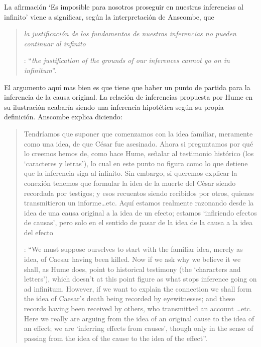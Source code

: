 La afirmación \enquote*{Es imposible para nosotros proseguir en nuestras inferencias al infinito} viene a significar, según la interpretación de Anscombe, que \blockquote[{\Cite[Cf.][87]{anscombe1981parmenides:humeandjulius}}: \enquote{\emph{the justification of the grounds of our inferences cannot go on in infinitum}}.]{\emph{la justificación de los fundamentos de nuestras inferencias no pueden continuar al infinito}}. El argumento aquí mas bien es que tiene que haber un punto de partida para la inferencia de la causa original. La relación de inferencias propuesta por Hume en su ilustración acabaría siendo una inferencia hipotética según su propia definición. Anscombe explica diciendo: \blockquote[{\Cite[117]{anscombe2011plato:humecaus}}: \enquote{We must suppose ourselves to start with the familiar idea, merely as idea, of Caesar having been killed. Now if we ask why we believe it we shall, as Hume does, point to historical testimony (the ‘characters and letters’), which doesn’t at this point figure as what stops inference going on ad infinitum. However, if we want to explain the connection we shall form the idea of Caesar’s death being recorded by eyewitnesses; and these records having been received by others, who transmitted an account \ldots etc. Here we really are arguing from the idea of an original cause to the idea of an effect; we are ‘inferring effects from causes’, though only in the sense of passing from the idea of the cause to the idea of the effect}.]{Tendríamos que suponer que comenzamos con la idea familiar, meramente como una idea, de que César fue asesinado. Ahora si preguntamos por qué lo creemos hemos de, como hace Hume, señalar al testimonio histórico (los `caracteres y letras'), lo cual en este punto no figura como lo que detiene que la inferencia siga al infinito. Sin embargo, si queremos explicar la conexión tenemos que formular la idea de la muerte del César siendo recordada por testigos; y esos recuentos siendo recibidos por otros, quienes transmitieron un informe\ldots etc. Aquí estamos realmente razonando desde la idea de una causa original a la idea de un efecto; estamos `infiriendo efectos de causas', pero solo en el sentido de pasar de la idea de la causa a la idea del efecto}.

